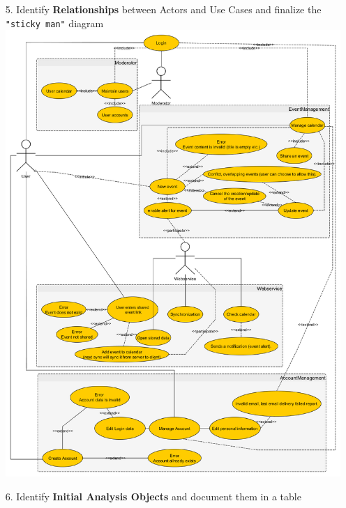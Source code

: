 \documentclass[a4paper]{article}
\begin{document}
	\pagebreak{}

\begin{enumerate}
		\item[5.] Identify \textbf{Relationships} between Actors and Use Cases and finalize the \verb= "sticky man"=  diagram\\
		\includegraphics[scale = 0.38]{UserCases.png}\\
		\pagebreak{}
		\item[6.] Identify \textbf{Initial Analysis Objects} and document them in a table\\
\end{enumerate}
\end{document}

